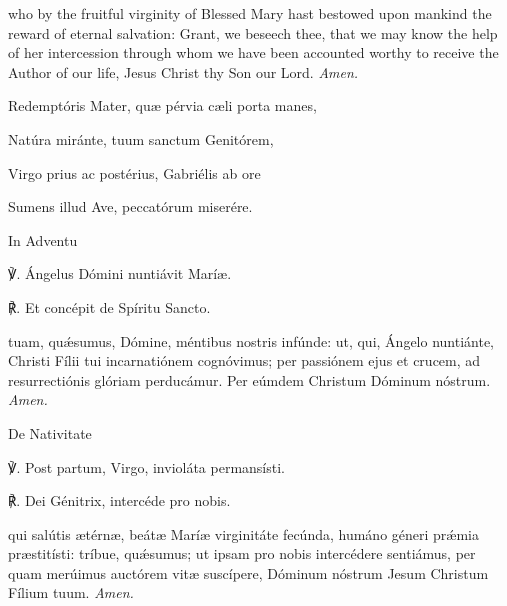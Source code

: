 {
{} who by the fruitful virginity of Blessed Mary hast bestowed upon mankind the reward of eternal salvation: Grant, we beseech thee, that we may know the help of her intercession through whom we have been accounted worthy to receive the Author of our life, Jesus Christ thy Son our Lord. \textit{Amen.}}{ Redemptóris Mater, qu{\ae} pérvia c{\ae}li porta manes,\par
{}
Natúra miránte, tuum sanctum Genitórem,\par
Virgo prius ac postérius, Gabriélis ab ore\par
Sumens illud Ave, peccatórum miserére.\par
\begin{inhead}
	In Adventu
\end{inhead}
℣. Ángelus Dómini nuntiávit Marí{\ae}.\par
℟. Et concépit de Spíritu Sancto.\par
\oremuslatin
{} tuam, quǽsumus, Dómine, méntibus nostris infúnde: ut, qui, Ángelo nuntiánte, Christi Fílii tui incarnatiónem cognóvimus; per passiónem ejus et crucem, ad resurrectiónis glóriam perducámur. Per eúmdem Christum Dóminum nóstrum. \textit{Amen.}\par
\begin{inhead}
	De Nativitate
\end{inhead}
℣. Post partum, Virgo, invioláta permansísti.\par
℟. Dei Génitrix, intercéde pro nobis.

\newpage

\oremuslatin
{} qui salútis {\ae}térn{\ae}, beát{\ae} Marí{\ae} virginitáte fecúnda, humáno géneri prǽmia pr{\ae}stitísti: tríbue, quǽsumus; ut ipsam pro nobis intercédere sentiámus, per quam merúimus auctórem vit{\ae} suscípere, Dóminum nóstrum Jesum Christum Fílium tuum. \textit{Amen.}}

